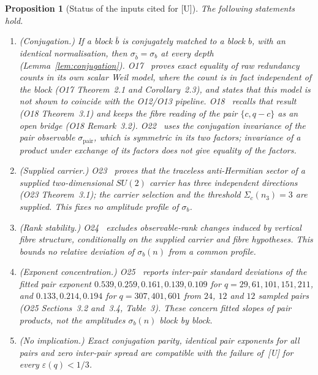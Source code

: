 \documentclass[12pt,a4paper]{article}
\newtheorem{proposition}[theorem]{Proposition}
\theoremstyle{definition}
\theoremstyle{remark}
\newcommand{\spair}{\sigma_{\mathrm{pair}}}
\begin{document}
      \begin{proposition}[Status of the inputs cited for \textup{[U]}]\label{prop:structural-U}
        The following statements hold.
        \begin{enumerate}
          \item[(i)] \textup{(Conjugation.)}
          If a block $\bar b$ is conjugately matched to a block $b$, with an identical normalisation, then
          $\sigma_{\bar b} = \sigma_b$ at every depth (Lemma~\ref{lem:conjugation}).
          O17~\cite{Beau2026a21} proves exact equality of raw redundancy counts in its own scalar Weil model,
          where the count is in fact independent of the block (O17 Theorem~2.1 and Corollary~2.3), and states that
          this model is not shown to coincide with the O12/O13 pipeline.
          O18~\cite{Beau2026a22} recalls that result (O18 Theorem~3.1) and keeps the fibre reading of the pair
          $\{c, q-c\}$ as an open bridge (O18 Remark~3.2).
          O22~\cite{Beau2026a26} uses the conjugation invariance of the pair observable $\spair$, which is symmetric
          in its two factors; invariance of a product under exchange of its factors does not give equality of the
          factors.

          \item[(ii)] \textup{(Supplied carrier.)}
          O23~\cite{Beau2026a27} proves that the traceless anti-Hermitian sector of a supplied two-dimensional
          $SU(2)$ carrier has three independent directions (O23 Theorem~3.1); the carrier selection and the threshold
          $\Sigma_c(n_3) = 3$ are supplied.
          This fixes no amplitude profile of $\sigma_b$.

          \item[(iii)] \textup{(Rank stability.)}
          O24~\cite{Beau2026a28} excludes observable-rank changes induced by vertical fibre structure, conditionally
          on the supplied carrier and fibre hypotheses.
          This bounds no relative deviation of $\sigma_b(n)$ from a common profile.

          \item[(iv)] \textup{(Exponent concentration.)}
          O25~\cite{Beau2026a29} reports inter-pair standard deviations of the fitted pair exponent
          $0.539, 0.259, 0.161, 0.139, 0.109$ for $q = 29, 61, 101, 151, 211$, and $0.133, 0.214, 0.194$ for
          $q = 307, 401, 601$ from $24$, $12$ and $12$ sampled pairs (O25 Sections~3.2 and~3.4, Table~3).
          These concern fitted slopes of pair products, not the amplitudes $\sigma_b(n)$ block by block.

          \item[(v)] \textup{(No implication.)}
          Exact conjugation parity, identical pair exponents for all pairs and zero inter-pair spread are compatible
          with the failure of~\textup{[U]} for every $\varepsilon(q) < 1/3$.
        \end{enumerate}
      \end{proposition}
\end{document}
